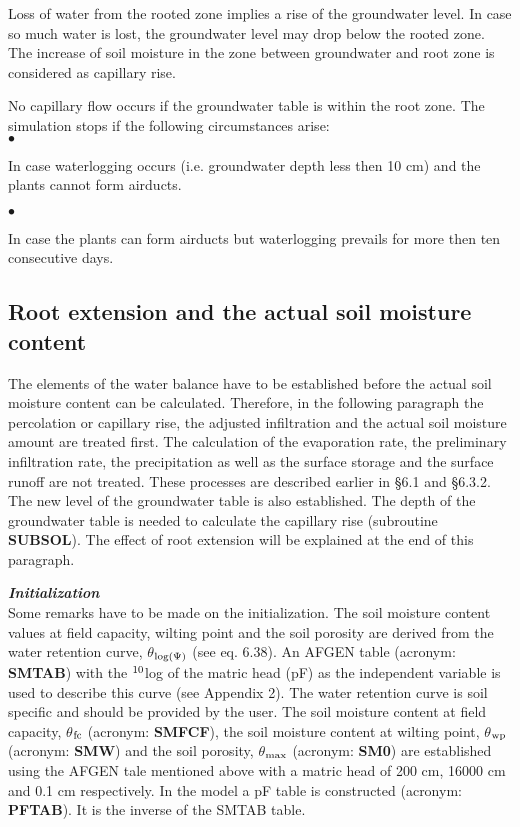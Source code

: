\begin{indenting}{1.27cm}
Loss of water from the rooted zone implies a rise of the groundwater level. In
case so much water is lost, the groundwater level may drop below the rooted
zone. The increase of soil moisture in the zone between groundwater and root
zone is considered as capillary rise.
\end{indenting}

 
No capillary flow occurs if the groundwater table is within the root zone. The simulation
stops if the following circumstances arise:\\
$\bullet$
\testlastline

\begin{indenting}{1.27cm}
In case waterlogging occurs (i.e. groundwater depth less then 10 cm) and the
plants cannot form airducts.
\end{indenting}
$\bullet$
\testlastline

\begin{indenting}{1.27cm}
In case the plants can form airducts but waterlogging prevails for more then ten
consecutive days.
\end{indenting}

\subsection{Root extension and the actual soil moisture content  }

The elements of the water balance have to be established before the actual soil moisture
content can be calculated. Therefore, in the following paragraph the percolation or
capillary rise, the adjusted infiltration and the actual soil moisture amount are treated
first. The calculation of the evaporation rate, the preliminary infiltration rate, the
precipitation as well as the surface storage and the surface runoff are not treated. These
processes are described earlier in \S 6.1 and \S 6.3.2. The new level of the groundwater
table is also established. The depth of the groundwater table is needed to calculate the
capillary rise (subroutine {\bf SUBSOL}). The effect of root extension will be explained at the
end of this paragraph.


{\bf {\it Initialization\/}}\\
Some remarks have to be made on the initialization. The soil moisture content values at
field capacity, wilting point and the soil porosity are derived from the water retention
curve, $\theta$$_{{\rm log(}{\rm \Psi}{)}}$ (see eq. 6.38). An AFGEN table (acronym: {\bf SMTAB}) with the $^{{\rm 10}}$log of the
matric head (pF) as the independent variable is used to describe this curve (see Appendix
2). The water retention curve is soil specific and should be provided by the user. The soil
moisture content at field capacity, {\bf $\theta$$_{{\rm fc}}$} (acronym: {\bf SMFCF}), the soil moisture content at
wilting point, {\bf $\theta$$_{{\rm wp}}$} (acronym: {\bf SMW}) and the soil porosity, {\bf $\theta$$_{{\rm max}}$} (acronym: {\bf SM0}) are
established using the AFGEN tale mentioned above with a matric head of 200 cm, 16000
cm and 0.1 cm respectively. In the model a pF table is constructed (acronym: {\bf PFTAB}).
It is the inverse of the SMTAB table.


